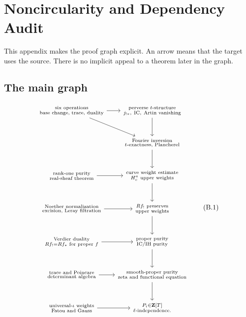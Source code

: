 \chapter{Noncircularity and Dependency Audit}
\label{app:perverse-dependency-audit}

This appendix makes the proof graph explicit.  An arrow means that the target
uses the source.  There is no implicit appeal to a theorem later in the graph.

\section{The main graph}

\[
\begin{tikzcd}[column sep=small,row sep=large]
\substack{\text{six operations}\\\text{base change, trace, duality}}
 \arrow[r] \arrow[dr] &
\substack{\text{perverse \(t\)-structure}\\j_{!*},\ \IC,\ \text{Artin vanishing}}
 \arrow[d] \\
&
\substack{\text{Fourier inversion}\\\text{\(t\)-exactness, Plancherel}}
 \arrow[d]\\
\substack{\text{rank-one purity}\\\text{real-sheaf theorem}}
 \arrow[r]&
\substack{\text{curve weight estimate}\\H_c^a\text{ upper weights}}
 \arrow[d]\\
\substack{\text{Noether normalization}\\\text{excision, Leray filtration}}
 \arrow[r]&
\substack{Rf_!\text{ preserves}\\\text{upper weights}}
 \arrow[d]\\
\substack{\text{Verdier duality}\\Rf_!=Rf_*\text{ for proper }f}
 \arrow[r]&
\substack{\text{proper purity}\\\text{IC/IH purity}}
 \arrow[d]\\
\substack{\text{trace and Poincare}\\\text{determinant algebra}}
 \arrow[r]&
\substack{\text{smooth-proper purity}\\\text{zeta and functional equation}}
 \arrow[d]\\
\substack{\text{universal-\(\iota\) weights}\\\text{Fatou and Gauss}}
 \arrow[r]&
\substack{P_i\in\mathbf Z[T]\\\ell\text{-independence}.}
\end{tikzcd}
\tag{B.1}\label{eq:dependency-graph}
\]

